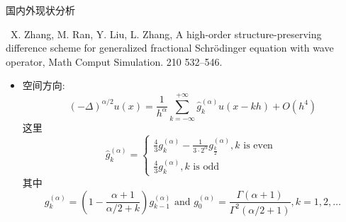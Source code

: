 \documentclass[aspectratio=169]{beamer}
\numberwithin{theorem}{section} %
\begin{document}
\begin{frame}{国内外现状分析}
	\begin{exampleblock}{\footnotesize \cite{zhangHighorderStructurepreservingDifference2023} \ X. Zhang, M. Ran, Y. Liu, L. Zhang, A high-order structure-preserving difference scheme for generalized fractional Schrödinger equation with wave operator, Math Comput Simulation. 210 {\color{purple}{(2023)}}  532–546.}
		\footnotesize
		\begin{itemize}
		\item 空间方向:
		\begin{equation*}
			(-\Delta)^{\alpha / 2} u(x)=\frac{1}{h^\alpha} \sum_{k=-\infty}^{+\infty} \widehat{g}_k^{(\alpha)} u(x-k h)+O\left(h^4\right)
			\end{equation*}
			这里
			\begin{equation*}
			\widehat{g}_k^{(\alpha)}=\left\{\begin{array}{l}
			\frac{4}{3} g_k^{(\alpha)}-\frac{1}{3 \cdot 2^\alpha} g_{\frac{k}{2}}^{(\alpha)}, k \text { is even } \\
			\frac{4}{3} g_k^{(\alpha)}, k \text { is odd }
			\end{array}\right.
			\end{equation*}
			其中
			\begin{equation*}
			g_k^{(\alpha)}=\left(1-\frac{\alpha+1}{\alpha / 2+k}\right) g_{k-1}^{(\alpha)} \text { and } g_0^{(\alpha)}=\frac{\Gamma(\alpha+1)}{\Gamma^2(\alpha / 2+1)}, k=1,2, \ldots
			\end{equation*}
			\end{itemize}
	\end{exampleblock}
	\end{frame}
\end{document}
